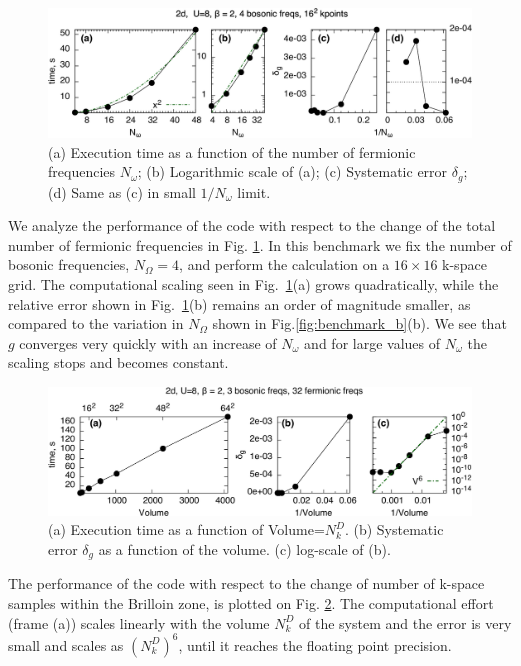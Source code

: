 \documentclass[3p,times,procedia]{elsarticle}
\begin{document}
\begin{figure}[ht]
\includegraphics[width=1.0\columnwidth]{time_ffreqs.pdf}
\caption{(a) Execution time as a function of the number of fermionic frequencies $N_{\omega}$; (b) Logarithmic scale of (a); (c) Systematic error $\delta_g$; (d) Same as (c) in small $1/N_{\omega}$ limit.}
\label{fig:benchmark_f}
\end{figure}

We analyze the performance of the code with respect to the change of the total number of fermionic frequencies in Fig. \ref{fig:benchmark_f}.  In this benchmark we fix the number of bosonic frequencies, $N_{\Omega}=4$, and perform the calculation on a $16\times16$ k-space grid. The computational scaling seen in Fig.~\ref{fig:benchmark_f}(a)  grows quadratically, while the relative error shown in Fig.~\ref{fig:benchmark_f}(b) remains an order of magnitude smaller, as compared to the variation in $N_{\Omega}$ shown in Fig.\ref{fig:benchmark_b}(b). We see that $g$ converges very quickly with an increase of $N_{\omega}$ and for large values of $N_{\omega}$ the scaling stops and becomes constant.

\begin{figure}[ht]
\includegraphics[width=1.0\columnwidth]{time_kpts.pdf}
\caption{(a) Execution time as a function of Volume=$N_k^D$. (b) Systematic error $\delta_g$ as a function of the volume. (c) log-scale of (b).}
\label{fig:benchmark_kpts}
\end{figure}

The performance of the code with respect to the change of number of k-space samples within the Brilloin zone, is plotted on Fig. \ref{fig:benchmark_kpts}. The computational effort (frame (a)) scales linearly with the volume $N_k^D$ of the system and the error is very small and scales as $(N_k^D)^6$, until it reaches the floating point precision.
\end{document}
